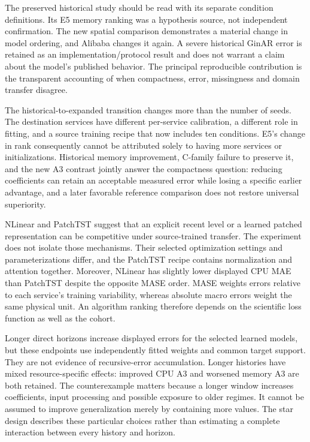 The preserved historical study should be read with its separate condition definitions. Its E5 memory ranking was a hypothesis source, not independent confirmation. The new spatial comparison demonstrates a material change in model ordering, and Alibaba changes it again. A severe historical GinAR error is retained as an implementation/protocol result and does not warrant a claim about the model's published behavior. The principal reproducible contribution is the transparent accounting of when compactness, error, missingness and domain transfer disagree.


The historical-to-expanded transition changes more than the number of seeds. The destination services have different per-service calibration, a different role in fitting, and a source training recipe that now includes ten conditions. E5's change in rank consequently cannot be attributed solely to having more services or initializations. Historical memory improvement, C-family failure to preserve it, and the new A3 contrast jointly answer the compactness question: reducing coefficients can retain an acceptable measured error while losing a specific earlier advantage, and a later favorable reference comparison does not restore universal superiority.

NLinear and PatchTST suggest that an explicit recent level or a learned patched representation can be competitive under source-trained transfer. The experiment does not isolate those mechanisms. Their selected optimization settings and parameterizations differ, and the PatchTST recipe contains normalization and attention together. Moreover, NLinear has slightly lower displayed CPU MAE than PatchTST despite the opposite MASE order. MASE weights errors relative to each service's training variability, whereas absolute macro errors weight the same physical unit. An algorithm ranking therefore depends on the scientific loss function as well as the cohort.

Longer direct horizons increase displayed errors for the selected learned models, but these endpoints use independently fitted weights and common target support. They are not evidence of recursive-error accumulation. Longer histories have mixed resource-specific effects: improved CPU A3 and worsened memory A3 are both retained. The counterexample matters because a longer window increases coefficients, input processing and possible exposure to older regimes. It cannot be assumed to improve generalization merely by containing more values. The star design describes these particular choices rather than estimating a complete interaction between every history and horizon.


